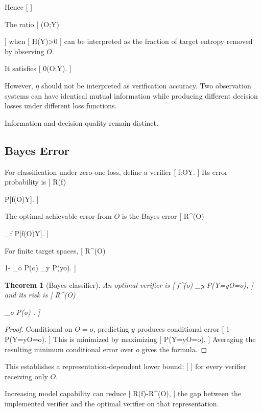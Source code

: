 \documentclass[11pt]{article}
\newtheorem{theorem}{Theorem} \newtheorem{proposition}{Proposition} \newtheorem{lemma}{Lemma} \newtheorem{corollary}{Corollary} \newtheorem{definition}{Definition} \newtheorem{remark}{Remark}
\begin{document}
Hence
[
]

The ratio
[
\eta(O;Y)

]
when
[
H(Y)>0
]
can be interpreted as the fraction of target entropy removed by observing $O$.

It satisfies
[
0\leq\eta(O;Y).
]

However, $\eta$ should not be interpreted as verification accuracy. Two observation systems can have identical mutual information while producing different decision losses under different loss functions.

Information and decision quality remain distinct.

\subsection{Bayes Error}

For classification under zero-one loss, define a verifier
[
f:\mathcal O\to\mathcal Y.
]
Its error probability is
[
R(f)

\mathbb P[f(O)\neq Y].
]

The optimal achievable error from $O$ is the Bayes error
[
R^\star(O)

\inf_f
\mathbb P[f(O)\neq Y].
]

For finite target spaces,
[
R^\star(O)

1-
\sum_o
P(o)
\max_y P(y\mid o).
]

\begin{theorem}[Bayes classifier]
An optimal verifier is
[
f^\star(o)
\in
\arg\max_y P(Y=y\mid O=o),
]
and its risk is
[
R^\star(O)

\sum_o
P(o)
.
]
\end{theorem}

\begin{proof}
Conditional on $O=o$, predicting $y$ produces conditional error
[
1-P(Y=y\mid O=o).
]
This is minimized by maximizing
[
P(Y=y\mid O=o).
]
Averaging the resulting minimum conditional error over $o$ gives the formula.
\end{proof}

This establishes a representation-dependent lower bound:
[
]
for every verifier receiving only $O$.

Increasing model capability can reduce
[
R(f)-R^\star(O),
]
the gap between the implemented verifier and the optimal verifier on that representation.
\end{document}
